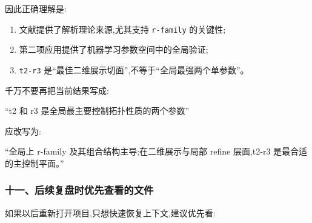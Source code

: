 \documentclass[lang=cn,scheme=chinese,color=blue,device=normal,toc=onecol,math=cm]{elegantbook}
\begin{document}
因此正确理解是:\par


\begin{enumerate}
\item 文献提供了解析理论来源,尤其支持 \texttt{r-family} 的关键性;
\item 第二项应用提供了机器学习参数空间中的全局验证;
\item \texttt{t2-r3} 是“最佳二维展示切面”,不等于“全局最强两个单参数”。
\end{enumerate}


千万不要再把当前结果写成:\par


“t2 和 r3 是全局最主要控制拓扑性质的两个参数”\par


应改写为:\par


“全局上 r-family 及其组合结构主导;在二维展示与局部 refine 层面,t2-r3 是最合适的主控制平面。”\par


\subsubsection{十一、后续复盘时优先查看的文件}


如果以后重新打开项目,只想快速恢复上下文,建议优先看:\par
\end{document}
